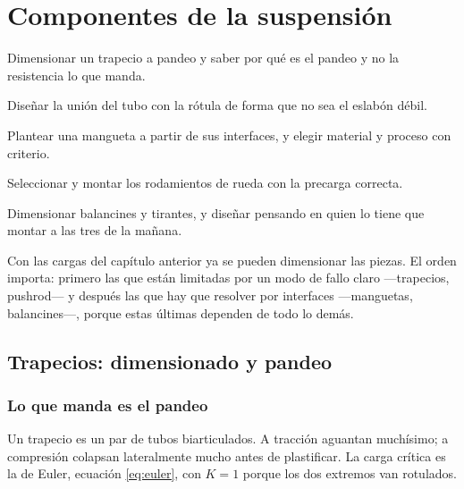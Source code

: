\chapter{Componentes de la suspensión}
\label{ch:componentes_suspension}

\begin{objetivos}
  \item Dimensionar un trapecio a pandeo y saber por qué es el pandeo y no la
        resistencia lo que manda.
  \item Diseñar la unión del tubo con la rótula de forma que no sea el eslabón
        débil.
  \item Plantear una mangueta a partir de sus interfaces, y elegir material y
        proceso con criterio.
  \item Seleccionar y montar los rodamientos de rueda con la precarga correcta.
  \item Dimensionar balancines y tirantes, y diseñar pensando en quien lo tiene
        que montar a las tres de la mañana.
\end{objetivos}


Con las cargas del capítulo anterior ya se pueden dimensionar las piezas. El
orden importa: primero las que están limitadas por un modo de fallo claro
---trapecios, pushrod--- y después las que hay que resolver por interfaces
---manguetas, balancines---, porque estas últimas dependen de todo lo demás.

\section{Trapecios: dimensionado y pandeo}
\label{sec:componentes_suspension:01}

\subsection{Lo que manda es el pandeo}

Un trapecio es un par de tubos biarticulados. A tracción aguantan muchísimo; a
compresión colapsan lateralmente mucho antes de plastificar. La carga crítica es
la de Euler, ecuación \eqref{eq:euler}, con $K = 1$ porque los dos extremos van
rotulados.


